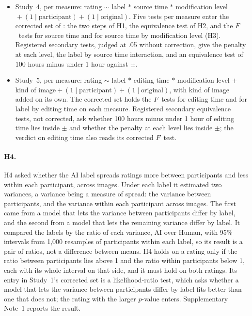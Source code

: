 \begin{itemize}
\item Study~4, per measure: rating $\sim$ label $*$ source time $*$ modification level${}+ (1 \mid \textrm{participant}) + (1 \mid \textrm{original})$. Five tests per measure enter the corrected set of \SFourNConfirmatory: the two steps of H1, the equivalence test of H2, and the $F$~tests for source time and for source time by modification level (H3). Registered secondary tests, judged at .05 without correction, give the penalty at each level, the label by source time interaction, and an equivalence test of 100 hours minus under 1 hour against $\pm$\SourceBound.
\item Study~5, per measure: rating $\sim$ label $*$ editing time $*$ modification level $+$ kind of image${}+ (1 \mid \textrm{participant}) + (1 \mid \textrm{original})$, with kind of image added on its own. The corrected set holds the $F$~tests for editing time and for label by editing time on each measure. Registered secondary equivalence tests, not corrected, ask whether 100 hours minus under 1 hour of editing time lies inside $\pm$\SFiveEditTimeBound{} and whether the penalty at each level lies inside $\pm$\SourceBound; the verdict on editing time also reads its corrected $F$~test.
\end{itemize}

\paragraph*{H4.}
H4 asked whether the AI label spreads ratings more between participants and less within each participant, across images. Under each label it estimated two variances, a variance being a measure of spread: the variance between participants, and the variance within each participant across images. The first came from a model that lets the variance between participants differ by label, and the second from a model that lets the remaining variance differ by label. It compared the labels by the ratio of each variance, AI over Human, with 95\% intervals from 1,000 resamples of participants within each label, so its result is a pair of ratios, not a difference between means. H4 holds on a rating only if the ratio between participants lies above 1 and the ratio within participants below 1, each with its whole interval on that side, and it must hold on both ratings. Its entry in Study~1's corrected set is a likelihood-ratio test, which asks whether a model that lets the variance between participants differ by label fits better than one that does not; the rating with the larger $p$-value enters. Supplementary Note~1 reports the result.

